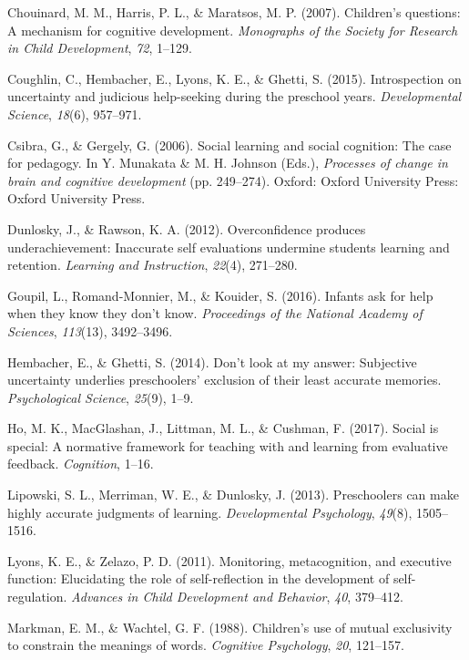 \documentclass[10pt, letterpaper]{article}
\begin{document}
\hypertarget{ref-Chouinard2007}{}
Chouinard, M. M., Harris, P. L., \& Maratsos, M. P. (2007). Children's
questions: A mechanism for cognitive development. \emph{Monographs of
the Society for Research in Child Development}, \emph{72}, 1--129.

\hypertarget{ref-Coughlin2015}{}
Coughlin, C., Hembacher, E., Lyons, K. E., \& Ghetti, S. (2015).
Introspection on uncertainty and judicious help-seeking during the
preschool years. \emph{Developmental Science}, \emph{18}(6), 957--971.

\hypertarget{ref-Csibra2006}{}
Csibra, G., \& Gergely, G. (2006). Social learning and social cognition:
The case for pedagogy. In Y. Munakata \& M. H. Johnson (Eds.),
\emph{Processes of change in brain and cognitive development} (pp.
249--274). Oxford: Oxford University Press: Oxford University Press.

\hypertarget{ref-Dunlosky2012}{}
Dunlosky, J., \& Rawson, K. A. (2012). Overconfidence produces
underachievement: Inaccurate self evaluations undermine students
learning and retention. \emph{Learning and Instruction}, \emph{22}(4),
271--280.

\hypertarget{ref-Goupil2016}{}
Goupil, L., Romand-Monnier, M., \& Kouider, S. (2016). Infants ask for
help when they know they don't know. \emph{Proceedings of the National
Academy of Sciences}, \emph{113}(13), 3492--3496.

\hypertarget{ref-Hembacher2014}{}
Hembacher, E., \& Ghetti, S. (2014). Don't look at my answer: Subjective
uncertainty underlies preschoolers' exclusion of their least accurate
memories. \emph{Psychological Science}, \emph{25}(9), 1--9.

\hypertarget{ref-Ho2017}{}
Ho, M. K., MacGlashan, J., Littman, M. L., \& Cushman, F. (2017). Social
is special: A normative framework for teaching with and learning from
evaluative feedback. \emph{Cognition}, 1--16.

\hypertarget{ref-Lipowski2013}{}
Lipowski, S. L., Merriman, W. E., \& Dunlosky, J. (2013). Preschoolers
can make highly accurate judgments of learning. \emph{Developmental
Psychology}, \emph{49}(8), 1505--1516.

\hypertarget{ref-Lyons2011}{}
Lyons, K. E., \& Zelazo, P. D. (2011). Monitoring, metacognition, and
executive function: Elucidating the role of self-reflection in the
development of self-regulation. \emph{Advances in Child Development and
Behavior}, \emph{40}, 379--412.

\hypertarget{ref-Markman1988}{}
Markman, E. M., \& Wachtel, G. F. (1988). Children's use of mutual
exclusivity to constrain the meanings of words. \emph{Cognitive
Psychology}, \emph{20}, 121--157.
\end{document}
